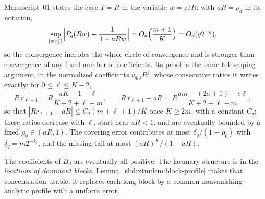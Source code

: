 \documentclass[11pt,a4paper]{article}
\theoremstyle{definition}
\begin{document}
Manuscript~01 states the case $T=R$ in the variable $w=z/R$: with
$aR=\rho_d$ in its notation,
\begin{equation}\label{sbd:edge:eq:profile-limit}
 \sup_{|w|\le1}\Bigl|P_q(Rw)-\frac1{1-aRw}\Bigr|
 =O_d\Bigl(\frac{m+1}K\Bigr)=O_d(q2^{-q}),
\end{equation}
so the convergence includes the whole circle of convergence and is
stronger than convergence of any fixed number of coefficients. Its proof
is the same telescoping argument, in the normalized coefficients
$v_{q,j}R^j$, whose consecutive ratios it writes exactly: for
$0\le\ell\le K-2$,
\begin{equation}\label{sbd:edge:eq:ratio-difference}
 R\,r_{\ell+1}=R\frac{aK-1-\ell}{K+2+\ell-m},\qquad
 R\,r_{\ell+1}-aR=R\frac{am-(2a+1)-c\ell}{K+2+\ell-m},
\end{equation}
so that $|Rr_{\ell+1}-aR|\le C_d(m+\ell+1)/K$ once $K\ge2m$, with a
constant $C_d$; these ratios decrease with $\ell$, start near $aR<1$, and
are eventually bounded by a fixed $\rho_0\in(aR,1)$. The covering error
contributes at most $\delta_q/(1-\rho_0)$ with $\delta_q=m2^{-k_0}$, and
the missing tail at most $(aR)^K/(1-aR)$.

The coefficients of $B_d$ are eventually all positive. The lacunary
structure is in the \emph{locations of dominant blocks}.
Lemma~\ref{sbd:xtm:lem:block-profile} makes that concentration usable: it
replaces each long block by a common nonvanishing analytic profile with a
uniform error.
\end{document}

